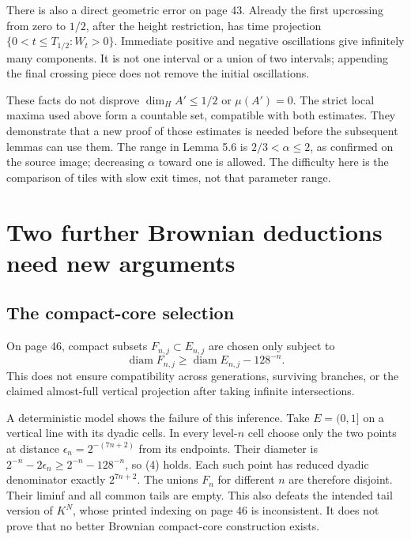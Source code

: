 \documentclass[10pt]{article}
\begin{document}
There is also a direct geometric error on page 43. Already the first upcrossing from zero to \(1/2\), after the height restriction, has time projection \(\{0<t\le T_{1/2}:W_t>0\}\). Immediate positive and negative oscillations give infinitely many components. It is not one interval or a union of two intervals; appending the final crossing piece does not remove the initial oscillations.\par
These facts do not disprove \(\dim_H A'\le1/2\) or \(\mu(A')=0\). The strict local maxima used above form a countable set, compatible with both estimates. They demonstrate that a new proof of those estimates is needed before the subsequent lemmas can use them. The range in Lemma 5.6 is \(2/3<\alpha\le2\), as confirmed on the source image; decreasing \(\alpha\) toward one is allowed. The difficulty here is the comparison of tiles with slow exit times, not that parameter range.\par
\section*{Two further Brownian deductions need new arguments}
\subsection*{The compact-core selection}
On page 46, compact subsets \(F_{n,j}\subset E_{n,j}\) are chosen only subject to \[\operatorname{diam}F_{n,j}\ge \operatorname{diam}E_{n,j}-128^{-n}.
 \tag{4}\] This does not ensure compatibility across generations, surviving branches, or the claimed almost-full vertical projection after taking infinite intersections.\par
A deterministic model shows the failure of this inference. Take \(E=(0,1]\) on a vertical line with its dyadic cells. In every level-\(n\) cell choose only the two points at distance \(\epsilon_n=2^{-(7n+2)}\) from its endpoints. Their diameter is \(2^{-n}-2\epsilon_n\ge2^{-n}-128^{-n}\), so (4) holds. Each such point has reduced dyadic denominator exactly \(2^{7n+2}\). The unions \(F_n\) for different \(n\) are therefore disjoint. Their liminf and all common tails are empty. This also defeats the intended tail version of \(K^N\), whose printed indexing on page 46 is inconsistent. It does not prove that no better Brownian compact-core construction exists.\par
\end{document}
